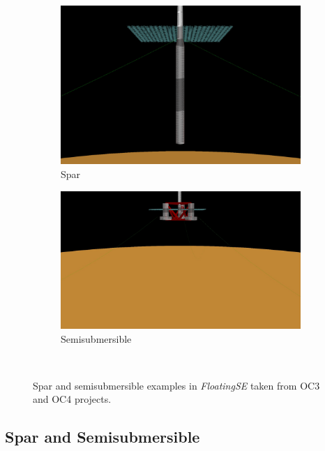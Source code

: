\begin{figure}[htb]
  \begin{subfigure}[b]{0.49\linewidth}
    \centering \includegraphics[width=\linewidth]{figs/spar-initial}
    \caption{Spar}
  \end{subfigure}
  \begin{subfigure}[b]{0.49\linewidth}
    \centering \includegraphics[width=\linewidth]{figs/semi-initial.jpg}
    \caption{Semisubmersible}
  \end{subfigure}\\
  \caption{Spar and semisubmersible examples in \textit{FloatingSE} taken from
    OC3\citep{OC3} and OC4\citep{OC4} projects.}
  \label{fig:initial}
\end{figure}

\subsection{Spar and Semisubmersible}

